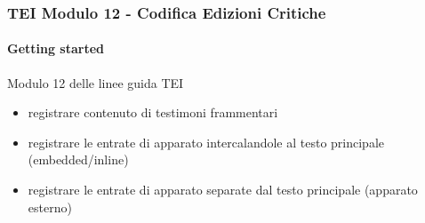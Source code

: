 \begin{frame}
    \frametitle{TEI Modulo 12 - Codifica Edizioni Critiche}
    \framesubtitle{Getting started}
    \addtocounter{nframe}{1}


    \begin{block}{Modulo 12 delle linee guida TEI}
        \begin{itemize}
            \item registrare contenuto di testimoni frammentari
            \item registrare le entrate di apparato intercalandole al testo principale (embedded/inline)
            \item registrare le entrate di apparato separate dal testo principale (apparato esterno)
        \end{itemize}
    \end{block}


\end{frame}

